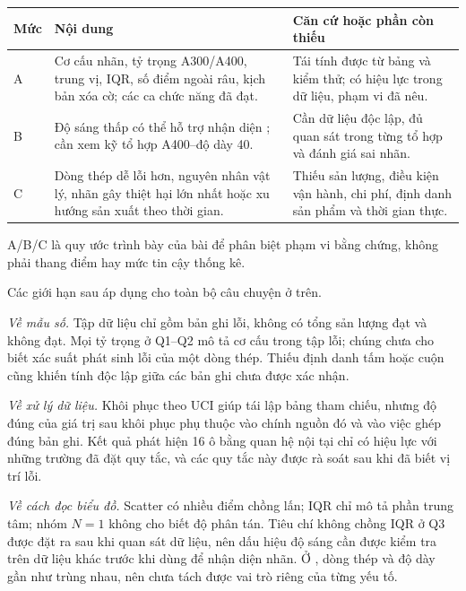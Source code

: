 \begin{center}\begin{minipage}{\linewidth}
\label{tab:ch4bangchung}
\small{}
\begin{tabularx}{\linewidth}{@{}p{0.8cm}Y Y@{}}
\toprule
Mức & Nội dung & Căn cứ hoặc phần còn thiếu \\
\midrule
A & Cơ cấu nhãn, tỷ trọng A300/A400, trung vị, IQR, số điểm ngoài râu, kịch bản xóa cờ; các ca chức năng đã đạt. & Tái tính được từ bảng và kiểm thử; có hiệu lực trong dữ liệu, phạm vi đã nêu. \\
B & Độ sáng thấp có thể hỗ trợ nhận diện ; cần xem kỹ tổ hợp A400--độ dày 40. & Cần dữ liệu độc lập, đủ quan sát trong từng tổ hợp và đánh giá sai nhãn. \\
C & Dòng thép dễ lỗi hơn, nguyên nhân vật lý, nhãn gây thiệt hại lớn nhất hoặc xu hướng sản xuất theo thời gian. & Thiếu sản lượng, điều kiện vận hành, chi phí, định danh sản phẩm và thời gian thực. \\
\bottomrule
\end{tabularx}
\smallskip
\par\raggedright\footnotesize A/B/C là quy ước trình bày của bài để phân biệt phạm vi bằng chứng, không phải thang điểm hay mức tin cậy thống kê.
\end{minipage}\end{center}

Các giới hạn sau áp dụng cho toàn bộ câu chuyện ở trên.

\emph{Về mẫu số.} Tập dữ liệu chỉ gồm bản ghi lỗi, không có tổng sản lượng đạt và không đạt. Mọi tỷ trọng ở Q1--Q2 mô tả cơ cấu trong tập lỗi; chúng chưa cho biết xác suất phát sinh lỗi của một dòng thép. Thiếu định danh tấm hoặc cuộn cũng khiến tính độc lập giữa các bản ghi chưa được xác nhận.

\emph{Về xử lý dữ liệu.} Khôi phục theo UCI giúp tái lập bảng tham chiếu, nhưng độ đúng của giá trị sau khôi phục phụ thuộc vào chính nguồn đó và vào việc ghép đúng bản ghi. Kết quả phát hiện 16 ô bằng quan hệ nội tại chỉ có hiệu lực với những trường đã đặt quy tắc, và các quy tắc này được rà soát sau khi đã biết vị trí lỗi.

\emph{Về cách đọc biểu đồ.} Scatter có nhiều điểm chồng lấn; IQR chỉ mô tả phần trung tâm; nhóm $N=1$ không cho biết độ phân tán. Tiêu chí không chồng IQR ở Q3 được đặt ra sau khi quan sát dữ liệu, nên dấu hiệu độ sáng cần được kiểm tra trên dữ liệu khác trước khi dùng để nhận diện nhãn. Ở , dòng thép và độ dày gần như trùng nhau, nên chưa tách được vai trò riêng của từng yếu tố.

